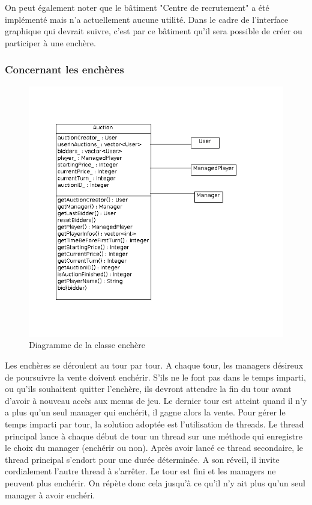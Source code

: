\documentclass[a4paper,titlepage]{scrreprt}
\begin{document}
  On peut également noter que le bâtiment "Centre de recrutement" a été implémenté mais n'a actuellement aucune utilité. Dans le cadre de l'interface graphique qui devrait suivre, c'est par ce bâtiment qu'il sera possible de créer ou participer à une enchère.

  \subsubsection{Concernant les enchères}
    \begin{figure}[H]
    \center
    \includegraphics[scale=0.4]{uml/class/ClassAuction.png}
    \caption{Diagramme de la classe enchère}
    \end{figure}	
  Les enchères se déroulent au tour par tour. A chaque tour, les managers désireux de poursuivre la vente doivent enchérir. S'ils ne le font pas dans le temps imparti, ou qu'ils souhaitent quitter l'enchère, ils devront attendre la fin du tour avant d'avoir à nouveau accès aux menus de jeu. Le dernier tour est atteint quand il n'y a plus qu'un seul manager qui enchérit, il gagne alors la vente.
  Pour gérer le temps imparti par tour, la solution adoptée est l'utilisation de threads. Le thread principal lance à chaque début de tour un thread sur une méthode qui enregistre le choix du manager (enchérir ou non). Après avoir lancé ce thread secondaire, le thread principal s'endort pour une durée déterminée. A son réveil, il invite cordialement l'autre thread à s'arrêter. Le tour est fini et les managers ne peuvent plus enchérir. On répète donc cela jusqu'à ce qu'il n'y ait plus qu'un seul manager à avoir enchéri.
\end{document}

